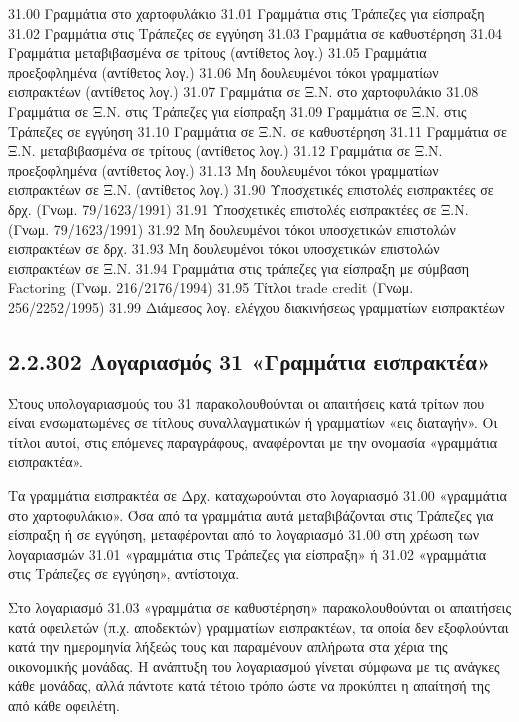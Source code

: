 \documentclass[A4,10pt,greek]{book}
\begin{document}
31.00   Γραμμάτια στο χαρτοφυλάκιο
31.01   Γραμμάτια στις Τράπεζες για είσπραξη
31.02   Γραμμάτια στις Τράπεζες σε εγγύηση
31.03   Γραμμάτια σε καθυστέρηση
31.04   Γραμμάτια μεταβιβασμένα σε τρίτους (αντίθετος λογ.)
31.05   Γραμμάτια προεξοφλημένα (αντίθετος λογ.)
31.06   Μη δουλευμένοι τόκοι γραμματίων εισπρακτέων (αντίθετος λογ.)
31.07   Γραμμάτια σε Ξ.Ν. στο χαρτοφυλάκιο
31.08   Γραμμάτια σε Ξ.Ν. στις Τράπεζες για είσπραξη
31.09   Γραμμάτια σε Ξ.Ν. στις Τράπεζες σε εγγύηση
31.10   Γραμμάτια σε Ξ.Ν. σε καθυστέρηση
31.11   Γραμμάτια σε Ξ.Ν. μεταβιβασμένα σε τρίτους (αντίθετος λογ.)
31.12   Γραμμάτια σε Ξ.Ν. προεξοφλημένα (αντίθετος λογ.)
31.13   Μη δουλευμένοι τόκοι γραμματίων εισπρακτέων σε Ξ.Ν. (αντίθετος λογ.)
31.90   Υποσχετικές επιστολές εισπρακτέες σε δρχ. (Γνωμ. 79/1623/1991)
31.91   Υποσχετικές επιστολές εισπρακτέες σε Ξ.Ν. (Γνωμ. 79/1623/1991)
31.92   Μη δουλευμένοι τόκοι υποσχετικών επιστολών εισπρακτέων σε δρχ.
31.93   Μη δουλευμένοι τόκοι υποσχετικών επιστολών εισπρακτέων σε Ξ.Ν.
31.94   Γραμμάτια στις τράπεζες για είσπραξη με σύμβαση Factoring (Γνωμ. 216/2176/1994)
31.95   Τίτλοι trade credit (Γνωμ. 256/2252/1995)
31.99   Διάμεσος λογ. ελέγχου διακινήσεως γραμματίων εισπρακτέων

\subsection{2.2.302 Λογαριασμός 31 «Γραμμάτια εισπρακτέα»}

Στους υπολογαριασμούς του 31 παρακολουθούνται οι απαιτήσεις κατά τρίτων που είναι ενσωματωμένες σε τίτλους συναλλαγματικών ή γραμματίων «εις διαταγήν». Οι τίτλοι αυτοί, στις επόμενες παραγράφους, αναφέρονται με την ονομασία «γραμμάτια εισπρακτέα».

Τα γραμμάτια εισπρακτέα σε Δρχ. καταχωρούνται στο λογαριασμό 31.00 «γραμμάτια στο χαρτοφυλάκιο». Όσα από τα γραμμάτια αυτά μεταβιβάζονται στις Τράπεζες για είσπραξη ή σε εγγύηση, μεταφέρονται από το λογαριασμό 31.00 στη χρέωση των λογαριασμών 31.01 «γραμμάτια στις Τράπεζες για είσπραξη» ή 31.02 «γραμμάτια στις Τράπεζες σε εγγύηση», αντίστοιχα.

Στο λογαριασμό 31.03 «γραμμάτια σε καθυστέρηση» παρακολουθούνται οι απαιτήσεις κατά οφειλετών (π.χ. αποδεκτών) γραμματίων εισπρακτέων, τα οποία δεν εξοφλούνται κατά την ημερομηνία λήξεώς τους και παραμένουν απλήρωτα στα χέρια της οικονομικής μονάδας. Η ανάπτυξη του λογαριασμού γίνεται σύμφωνα με τις ανάγκες κάθε μονάδας, αλλά πάντοτε κατά τέτοιο τρόπο ώστε να προκύπτει η απαίτησή της από κάθε οφειλέτη.
\end{document}

